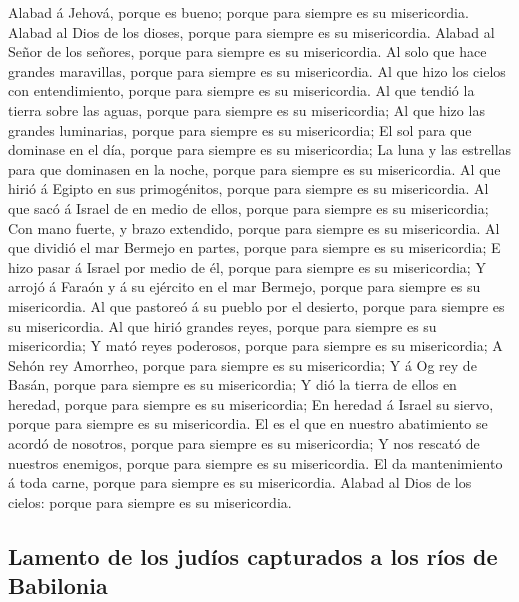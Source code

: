  Alabad á Jehová, porque es bueno; porque para siempre es
su misericordia.  Alabad al Dios de los dioses, porque
para siempre es su misericordia.  Alabad al Señor de los
señores, porque para siempre es su misericordia.  Al solo
que hace grandes maravillas, porque para siempre es su misericordia.
 Al que hizo los cielos con entendimiento, porque para
siempre es su misericordia.  Al que tendió la tierra sobre
las aguas, porque para siempre es su misericordia;  Al que
hizo las grandes luminarias, porque para siempre es su misericordia;
 El sol para que dominase en el día, porque para siempre
es su misericordia;  La luna y las estrellas para que
dominasen en la noche, porque para siempre es su misericordia.
 Al que hirió á Egipto en sus primogénitos, porque para
siempre es su misericordia.  Al que sacó á Israel de en
medio de ellos, porque para siempre es su misericordia; 
Con mano fuerte, y brazo extendido, porque para siempre es su
misericordia.  Al que dividió el mar Bermejo en partes,
porque para siempre es su misericordia;  E hizo pasar á
Israel por medio de él, porque para siempre es su misericordia;
 Y arrojó á Faraón y á su ejército en el mar Bermejo,
porque para siempre es su misericordia.  Al que pastoreó
á su pueblo por el desierto, porque para siempre es su misericordia.
 Al que hirió grandes reyes, porque para siempre es su
misericordia;  Y mató reyes poderosos, porque para
siempre es su misericordia;  A Sehón rey Amorrheo, porque
para siempre es su misericordia;  Y á Og rey de Basán,
porque para siempre es su misericordia;  Y dió la tierra
de ellos en heredad, porque para siempre es su misericordia;
 En heredad á Israel su siervo, porque para siempre es su
misericordia.  El es el que en nuestro abatimiento se
acordó de nosotros, porque para siempre es su misericordia;
 Y nos rescató de nuestros enemigos, porque para siempre
es su misericordia.  El da mantenimiento á toda carne,
porque para siempre es su misericordia.  Alabad al Dios
de los cielos: porque para siempre es su misericordia.

\hypertarget{lamento-de-los-juduxedos-capturados-a-los-ruxedos-de-babilonia}{%
\subsection{Lamento de los judíos capturados a los ríos de
Babilonia}\label{lamento-de-los-juduxedos-capturados-a-los-ruxedos-de-babilonia}}

